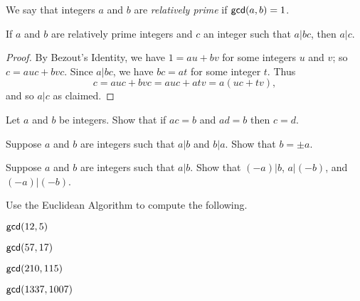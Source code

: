 \begin{dfn}
We say that integers \(a\) and \(b\) are \emph{relatively prime} if \(\mathsf{gcd}(a, b) = 1\).
\end{dfn}

\begin{thm}
If \(a\) and \(b\) are relatively prime integers and \(c\) an integer such that \(a | bc\), then \(a|c\).
\end{thm}

\begin{proof}
By Bezout's Identity, we have \(1 = au + bv\) for some integers \(u\) and \(v\); so \(c = auc + bvc\).
Since \(a|bc\), we have \(bc = at\) for some integer \(t\).
Thus \[ c = auc + bvc = auc + atv = a(uc + tv), \] and so \(a|c\) as claimed.
\end{proof}



\Exercises%

\begin{exercise}
Let \(a\) and \(b\) be integers.
Show that if \(ac = b\) and \(ad = b\) then \(c = d\).
\end{exercise}

\begin{exercise}
Suppose \(a\) and \(b\) are integers such that \(a|b\) and \(b|a\). Show that \(b = \pm a\).
\end{exercise}

\begin{exercise}
Suppose \(a\) and \(b\) are integers such that \(a|b\).
Show that \((-a)|b\), \(a|(-b)\), and \((-a)|(-b)\).
\end{exercise}

\begin{exercise}
Use the Euclidean Algorithm to compute the following.
\begin{proplist*}
\item \(\mathsf{gcd}(12, 5)\)
\item \(\mathsf{gcd}(57, 17)\)
\item \(\mathsf{gcd}(210, 115)\)
\item \(\mathsf{gcd}(1337, 1007)\)
\end{proplist*}
\end{exercise}

